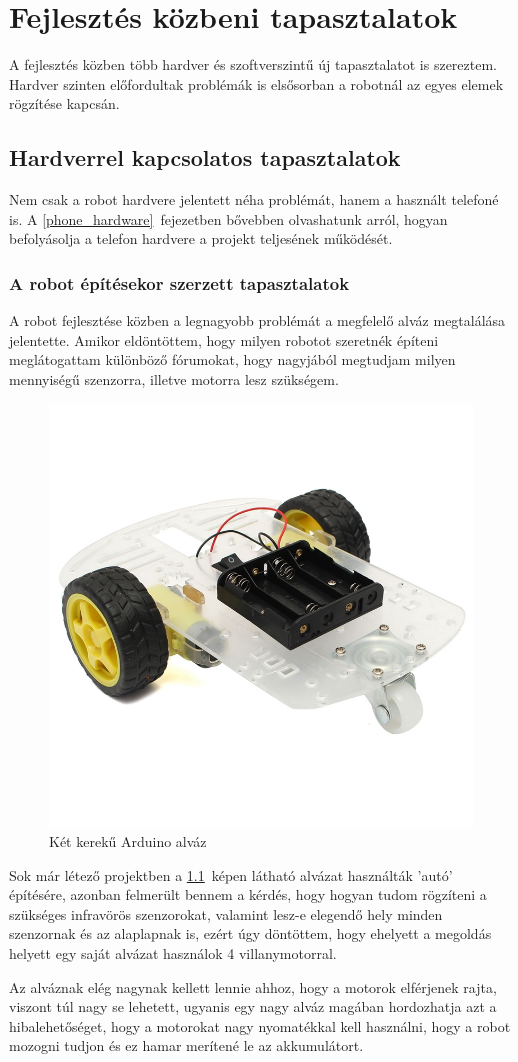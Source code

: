 \documentclass[]{thesis-ekf}
\theoremstyle{definition}
\begin{document}
\chapter{Fejlesztés közbeni tapasztalatok}\label{fejezet_6}
A fejlesztés közben több hardver és szoftverszintű új tapasztalatot is szereztem. Hardver szinten előfordultak problémák is elsősorban a robotnál az egyes elemek rögzítése kapcsán.
\section{Hardverrel kapcsolatos tapasztalatok}
Nem csak a robot hardvere jelentett néha problémát, hanem a használt telefoné is. A \ref{phone_hardware}~fejezetben bővebben olvashatunk arról, hogyan befolyásolja a telefon hardvere a projekt teljesének működését.
\subsection{A robot építésekor szerzett tapasztalatok}
A robot fejlesztése közben a legnagyobb problémát a megfelelő alváz megtalálása jelentette.
Amikor eldöntöttem, hogy milyen robotot szeretnék építeni meglátogattam különböző fórumokat, hogy nagyjából megtudjam milyen mennyiségű szenzorra, illetve motorra lesz szükségem.
\begin{figure}[h]
	\centering
	\includegraphics[width=0.4\linewidth]{images/robot_build/2_wheel_car}
	\caption{Két kerekű Arduino alváz}
	\label{2_wheeler}
\end{figure}

Sok már létező projektben a \ref{2_wheeler}~képen látható alvázat használták 'autó' építésére, azonban felmerült bennem a kérdés, hogy hogyan tudom rögzíteni a szükséges infravörös szenzorokat, valamint lesz-e elegendő hely minden szenzornak és az alaplapnak is, ezért úgy döntöttem, hogy ehelyett a megoldás helyett egy saját alvázat használok 4 villanymotorral.

Az alváznak elég nagynak kellett lennie ahhoz, hogy a motorok elférjenek rajta, viszont túl nagy se lehetett, ugyanis egy nagy alváz magában hordozhatja azt a hibalehetőséget, hogy a motorokat nagy nyomatékkal kell használni, hogy a robot mozogni tudjon és ez hamar merítené le az akkumulátort.
\end{document}
